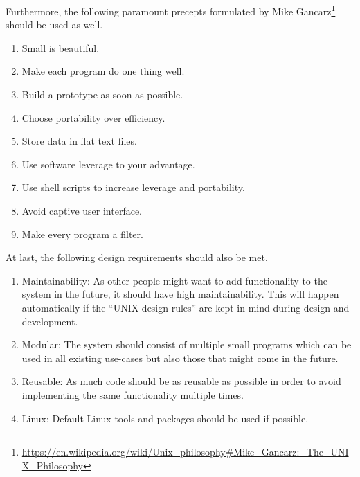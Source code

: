 \noindent Furthermore, the following paramount precepts formulated by Mike Gancarz\footnote{\url{https://en.wikipedia.org/wiki/Unix_philosophy\#Mike_Gancarz:_The_UNIX_Philosophy}} should be used as well.
\begin{enumerate}[ref=R-D-\alph* on P.\thepage, label=\Alph*]
	\item Small is beautiful. \label{req:design:small}
	\item Make each program do one thing well. \label{req:design:onethingwell}
	\item Build a prototype as soon as possible. \label{req:design:prototype}
	\item Choose portability over efficiency. \label{req:design:efficiency}
	\item Store data in flat text files. \label{req:design:flattext}
	\item Use software leverage to your advantage. \label{req:design:sw}
	\item Use shell scripts to increase leverage and portability. \label{req:design:shell}
	\item Avoid captive user interface. \label{req:design:iface}
	\item Make every program a filter. \label{req:design:filter}
\end{enumerate}

\noindent At last, the following design requirements should also be met.


\begin{enumerate}[ref=R-D-\arabic* on P.\thepage]
	\item Maintainability: As other people might want to add functionality to the system in the future, it should have high maintainability. This will happen automatically if the ``UNIX design rules'' are kept in mind during design and development. \label{req:design:maintainability}

	\item Modular: The system should consist of multiple small programs which can be used in all existing use-cases but also those that might come in the future. \label{req:design:modular}

	\item Reusable: As much code should be as reusable as possible in order to avoid implementing the same functionality multiple times. \label{req:design:resuable}

    \item Linux: Default Linux tools and packages should be used if possible. \label{req:design:linux}
\end{enumerate}

